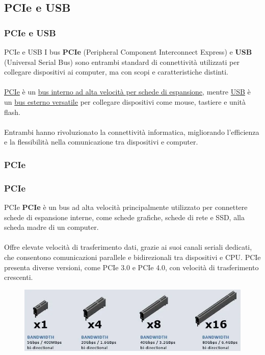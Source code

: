 \subsection[PCIe e USB]{PCIe e USB}
\begin{frame}
	\frametitle{PCIe e USB}
	  
	\begin{block}{PCIe e USB}
		I bus \textbf{PCIe} (Peripheral Component Interconnect Express) e \textbf{USB} (Universal Serial Bus) sono entrambi standard di connettività utilizzati per collegare dispositivi ai computer, ma con scopi e caratteristiche distinti.\\~\\
		
		\underline{PCIe} è un \underline{bus interno ad alta velocità per schede di espansione}, mentre \underline{USB} è un \underline{bus esterno versatile} per collegare dispositivi come mouse, tastiere e unità flash.\\~\\
		
		Entrambi hanno rivoluzionato la connettività informatica, migliorando l'efficienza e la flessibilità nella comunicazione tra dispositivi e computer.
		
	\end{block}
\end{frame}


\subsubsection[PCIe]{PCIe}
\begin{frame}
	\frametitle{PCIe}
	  
	\begin{block}{PCIe}
		\textbf{PCIe} è un bus ad alta velocità principalmente utilizzato per connettere schede di espansione interne, come schede grafiche, schede di rete e SSD, alla scheda madre di un computer.\\~\\
		
		Offre elevate velocità di trasferimento dati, grazie ai suoi canali seriali dedicati, che consentono comunicazioni parallele e bidirezionali tra dispositivi e CPU. PCIe presenta diverse versioni, come PCIe 3.0 e PCIe 4.0, con velocità di trasferimento crescenti.
		
		\begin{figure}[!htbp]
			\centering
			\includegraphics[width=0.65\linewidth]{images/6_bus/PCIe.png}
		\end{figure}
	\end{block}
\end{frame}


